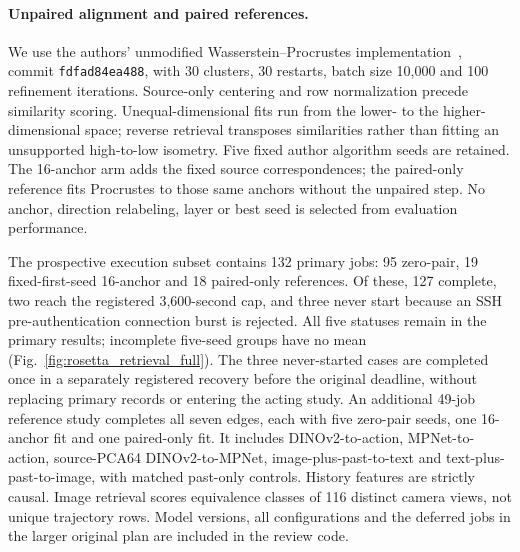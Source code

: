 \documentclass[10pt,onecolumn,letterpaper]{article}
\begin{document}
\paragraph{Unpaired alignment and paired references.}
We use the authors' unmodified Wasserstein--Procrustes implementation~\cite{schnaus2026rosetta}, commit
\texttt{fdfad84ea488}, with 30 clusters, 30 restarts, batch size 10,000 and 100 refinement iterations. Source-only
centering and row normalization precede similarity scoring. Unequal-dimensional fits run from the lower- to the
higher-dimensional space; reverse retrieval transposes similarities rather than fitting an unsupported
high-to-low isometry. Five fixed author algorithm seeds are retained. The 16-anchor arm adds the fixed source
correspondences; the paired-only reference fits Procrustes to those same anchors without the unpaired step.
No anchor, direction relabeling, layer or best seed is selected from evaluation performance.

The prospective execution subset contains 132 primary jobs: 95 zero-pair, 19 fixed-first-seed 16-anchor and
18 paired-only references. Of these, 127 complete, two reach the registered 3,600-second cap, and three never
start because an SSH pre-authentication connection burst is rejected. All five statuses remain in the primary
results; incomplete five-seed groups have no mean (Fig.~\ref{fig:rosetta_retrieval_full}). The three never-started cases are completed once in a
separately registered recovery before the original deadline, without replacing primary records or entering the
acting study. An additional 49-job reference study completes all seven edges, each with five zero-pair seeds,
one 16-anchor fit and one paired-only fit. It includes DINOv2-to-action, MPNet-to-action, source-PCA64
DINOv2-to-MPNet, image-plus-past-to-text and text-plus-past-to-image, with matched past-only controls.
History features are strictly causal. Image retrieval scores equivalence classes of 116 distinct camera views,
not unique trajectory rows. Model versions, all configurations and the deferred jobs in the larger original plan
are included in the review code.
\end{document}
